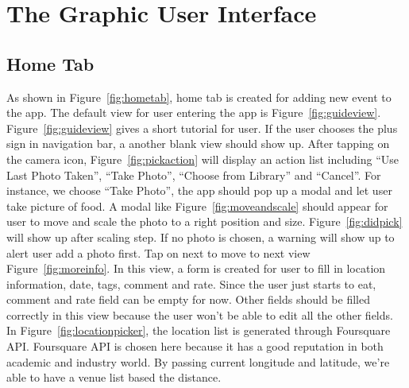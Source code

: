 \chapter{The Graphic User Interface} %
\label{cha:the_graphic_user_interface}

\section{Home Tab} %
\label{sec:tabs}
	As shown in Figure~\ref{fig:hometab}, home tab is created for adding new event to the app. The default view for user entering the app is Figure~\ref{fig:guideview}. \\
	
	Figure~\ref{fig:guideview} gives a short tutorial for user. If the user chooses the plus sign in navigation bar, a another blank view should show up. After tapping on the camera icon, Figure~\ref{fig:pickaction} will display an action list including ``Use Last Photo Taken'', ``Take Photo'', ``Choose from Library'' and ``Cancel''. For instance, we choose ``Take Photo'', the app should pop up a modal and let user take picture of food. A modal like Figure~\ref{fig:moveandscale} should appear for user to move and scale the photo to a right position and size. Figure~\ref{fig:didpick} will show up after scaling step. If no photo is chosen, a warning will show up to alert user add a photo first. Tap on next to move to next view Figure~\ref{fig:moreinfo}. In this view, a form is created for user to fill in location information, date, tags, comment and rate. Since the user just starts to eat, comment and 
rate field can be empty for now. Other fields should be filled correctly in this view because the user won't be able to edit all the other fields. In Figure~\ref{fig:locationpicker}, the location list is generated through Foursquare API. Foursquare API is chosen here because it has a good reputation in both academic and industry world. By passing current longitude and latitude, we're able to have a venue list based the distance.

